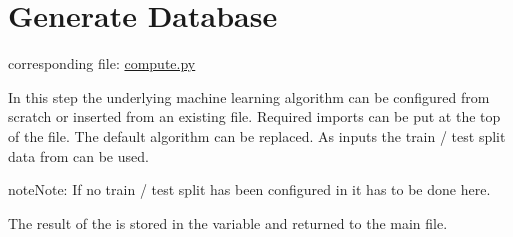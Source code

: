 \documentclass[letterpaper,10pt,english]{sphinxmanual}
\begin{document}
\section{Generate Database}
\label{\detokenize{Generate_Database:generate-database}}\label{\detokenize{Generate_Database:compute}}\label{\detokenize{Generate_Database::doc}}
corresponding file: \href{https://github.com/weinertmos/ForestFire/blob/master/source/ForestFire/compute.py}{compute.py}

In this step the underlying machine learning algorithm can be configured from scratch or inserted from an existing file.
Required imports can be put at the top of the file.
The default algorithm can be replaced.
As inputs the train / test split data from {\hyperref[\detokenize{Importing_Data:import-data}]{}} can be used.

\begin{sphinxadmonition}{note}{Note:}
If no train / test split has been configured in {\hyperref[\detokenize{Importing_Data:import-data}]{}} it has to be done here.
\end{sphinxadmonition}

The result of the {\hyperref[\detokenize{Overview:mla}]{}} is stored in the variable  and returned to the main file.
\end{document}
